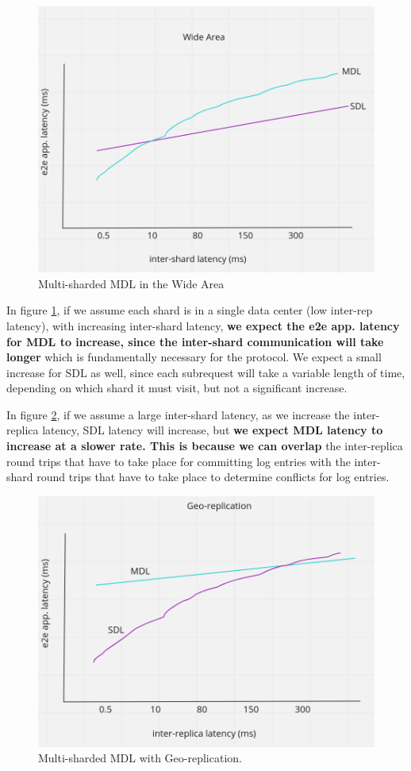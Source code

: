 \begin{figure}[!htb]
\includegraphics[scale=.24]{wide-area.png}
\caption{Multi-sharded MDL in the Wide Area}
\label{fig:wide-area}
\end{figure}
In figure \ref{fig:wide-area}, if we assume each shard is in a single data center (low inter-rep latency), with increasing inter-shard latency, \textbf{we expect the e2e app. latency for MDL to increase, since the inter-shard communication will take longer} which is fundamentally necessary for the protocol. We expect a small increase for SDL as well, since each subrequest will take a variable length of time, depending on which shard it must visit, but not a significant increase.

In figure \ref{fig:geo-rep}, if we assume a large inter-shard latency, as we increase the inter-replica latency, SDL latency will increase, but \textbf{we expect MDL latency to increase at a slower rate. This is because we can overlap} the inter-replica round trips that have to take place for committing log entries with the inter-shard round trips that have to take place to determine conflicts for log entries.
\begin{figure}[!htb]
\includegraphics[scale=.25]{geo-rep.png}
\caption{Multi-sharded MDL with Geo-replication.}
\label{fig:geo-rep}
\end{figure}

